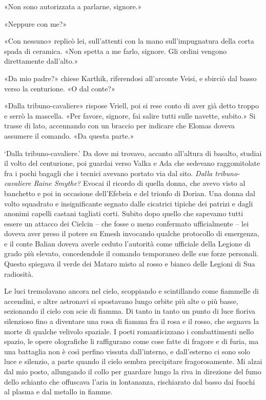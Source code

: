 «Non sono autorizzata a parlarne, signore.»

«Neppure con me?»

«Con nessuno» replicò lei, sull'attenti con la mano sull'impugnatura
della corta spada di ceramica. «Non spetta a me farlo, signore. Gli
ordini vengono direttamente dall'alto.»

«Da mio padre?» chiese Karthik, riferendosi all'arconte Veisi, e sbirciò
dal basso verso la centurione. «O dal conte?»

«Dalla tribuno-cavaliere» rispose Vriell, poi si rese conto di aver già
detto troppo e serrò la mascella. «Per favore, signore, fai salire tutti
sulle navette, subito.» Si trasse di lato, accennando con un braccio per
indicare che Elomas doveva assumere il comando. «Da questa parte.»

`Dalla tribuno-cavaliere.' Da dove mi trovavo, accanto all'altura di
basalto, studiai il volto del centurione, poi guardai verso Valka e Ada
che sedevano raggomitolate fra i pochi bagagli che i tecnici avevano
portato via dal sito. \emph{Dalla tribuno-cavaliere Raine Smythe?}
Evocai il ricordo di quella donna, che avevo visto al banchetto e poi in
occasione dell'Efebeia e del trionfo di Dorian. Una donna dal volto
squadrato e insignificante segnato dalle cicatrici tipiche dei patrizi e
dagli anonimi capelli castani tagliati corti. Subito dopo quello che
sapevamo tutti essere un attacco dei Cielcin -- che fosse o meno
confermato ufficialmente -- lei doveva aver preso il potere su Emesh
invocando qualche protocollo di emergenza, e il conte Balian doveva
averle ceduto l'autorità come ufficiale della Legione di grado più
elevato, concedendole il comando temporaneo delle sue forze personali.
Questo spiegava il verde dei Mataro misto al rosso e bianco delle
Legioni di Sua radiosità.

Le luci tremolavano ancora nel cielo, scoppiando e scintillando come
fiammelle di accendini, e altre astronavi si spostavano lungo orbite più
alte o più basse, sezionando il cielo con scie di fiamma. Di tanto in
tanto un punto di luce fioriva silenzioso fino a diventare una rosa di
fiamma fra il rosa e il rosso, che segnava la morte di qualche velivolo
spaziale. I poeti romanticizzano i combattimenti nello spazio, le opere
olografiche li raffigurano come cose fatte di fragore e di furia, ma una
battaglia non è così perfino vissuta dall'interno, e dall'esterno ci
sono solo luce e silenzio, a parte quando il cielo sembra precipitare
fragorosamente. Mi alzai dal mio posto, allungando il collo per guardare
lungo la riva in direzione del fumo dello schianto che offuscava l'aria
in lontananza, rischiarato dal basso dai fuochi al plasma e dal metallo
in fiamme.

